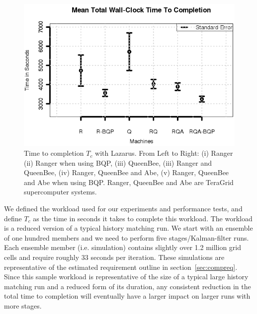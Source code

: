 \documentclass{acm_proc_article-sp}
\newcommand{\tc}{$T_c$ }
\newcommand{\jhanote}[1]{ {\textcolor{red} { ***Jha: #1 }}}
\newcommand{\yyenote}[1]{ {\textcolor{blue} { ***yye00: #1 }}}
\newcommand{\jhanote}[1]{}
\newcommand{\yyenote}[1]{}
\begin{document}
\begin{figure}
\begin{center}
  \includegraphics*[scale=0.5,angle=0]{figures/Figure7.png}
\end{center}
\caption{Time to completion \tc with Lazarus. From Left to Right: (i)
  Ranger (ii) Ranger when using BQP, (iii) QueenBee, (iii) Ranger and
  QueenBee, (iv) Ranger, QueenBee and Abe, (v) Ranger, QueenBee and
  Abe when using BQP. Ranger, QueenBee and Abe are TeraGrid supercomputer
  systems. %
}
\label{fig:SingleVsDistributed}
\end{figure}



We defined the workload used for our experiments and performance
tests, and define \tc as the time in seconds it takes to complete this
workload. The workload is a reduced version of a typical history
matching run. We start with an ensemble of one hundred members and we
need to perform five stages/Kalman-filter runs. Each ensemble member
(i.e. simulation) contains slightly over 1.2 million grid cells
and require roughly 33 seconds per iteration. These simulations are representative
of the estimated requirement outline in section~\ref{sec:compreq}.
Since this sample workload is representative
of the size of a typical large history matching run and a reduced form
of its duration, any consistent reduction in the total time to
completion will eventually have a larger impact on larger runs with
more stages.
\end{document}
